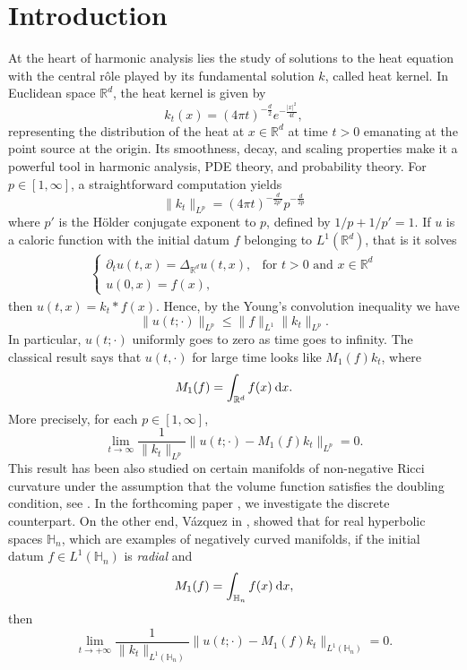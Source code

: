\documentclass[11pt]{amsart}
\newcommand{\RR}{\mathbb{R}}
\theoremstyle{plain}
\theoremstyle{definition}
\numberwithin{equation}{section}
\begin{document}
\section*{Introduction}
At the heart of harmonic analysis lies the study of solutions to the heat equation with the central r\^ole 
played by its fundamental solution $k$, called heat kernel. In Euclidean space $\RR^d$, the heat kernel
is given by
\[
	k_t(x) = (4 \pi t)^{-\frac{d}{2}} e^{-\frac{|x|^2}{4t}},
\]
representing the distribution of the heat at $x \in \RR^d$ at time $t > 0$ emanating at the point source at
the origin. Its smoothness, decay, and scaling properties make it a powerful tool in harmonic analysis, PDE theory, and 
probability theory. For $p \in [1, \infty]$, a straightforward computation yields
\[
	\|k_t\|_{L^p} = 
	(4 \pi t)^{-\frac{d}{2p'}} p^{-\frac{d}{2p}}
\]
where $p'$ is the H\"older conjugate exponent to $p$, defined by $1/p + 1/p' = 1$. If $u$ is a caloric function
with the initial datum $f$ belonging to $L^1(\RR^d)$, that is it solves
\begin{align*}
	\begin{cases}
		\partial_{t}u(t,x) = \Delta_{\mathbb{R}^{d}} u(t,x), &\text{for } t>0 \text{ and } x \in \RR^d\\[0,5pt]
		u(0,x) =f(x),
	\end{cases}
\end{align*}
then $u(t, x) = k_t * f(x)$. Hence, by the Young's convolution inequality we have
\[
	\|u(t; \cdot)\|_{L^p} \leqslant \|f\|_{L^1} \|k_t\|_{L^p}.
\]
In particular, $u(t; \cdot)$ uniformly goes to zero as time goes to infinity. The classical result says that $u(t, \cdot)$
for large time looks like $M_1(f) k_t$, where
\[
	M_1(f) = \int_{\RR^d} f(x) {\: \rm d} x.
\]
More precisely, for each $p \in [1, \infty]$,
\[
	\lim_{t \to \infty} \frac{1}{\|k_t\|_{L^p}} \big\| u(t; \cdot) - M_1(f) k_t \big\|_{L^p} = 0.
\]
This result has been also studied on certain manifolds of non-negative Ricci curvature under the assumption that 
the volume function satisfies the doubling condition, see \cite{GPZ2023}. In the forthcoming paper \cite{GPT2025},
we investigate the discrete counterpart. On the other end, V\'azquez in \cite{VazHyp},
showed that for real hyperbolic spaces $\mathbb{H}_n$, which are examples of negatively curved manifolds,
if the initial datum $f \in L^1(\mathbb{H}_n)$ is \emph{radial} and
\[
	M_1(f) = \int_{\mathbb{H}_n} f(x) {\: \rm d} x,
\]
then
\begin{equation}
	\label{eq:84}
	\lim_{t \to +\infty} 
	\frac{1}{\|k_t\|_{L^1(\mathbb{H}_n)}}
	\|u(t; \cdot) - M_1(f) k_t \|_{L^1(\mathbb{H}_n)} = 0.
\end{equation}
\end{document}
